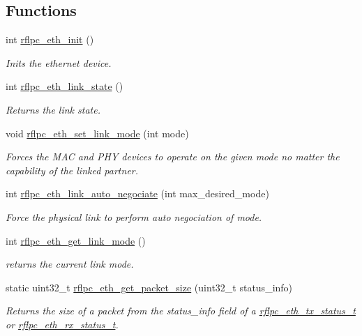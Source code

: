 \subsection*{Functions}
\begin{DoxyCompactItemize}
\item 
\hypertarget{group__eth_gade7d32e2e9ff5cb517b47513b0a293a8}{int \hyperlink{group__eth_gade7d32e2e9ff5cb517b47513b0a293a8}{rflpc\-\_\-eth\-\_\-init} ()}\label{group__eth_gade7d32e2e9ff5cb517b47513b0a293a8}

\begin{DoxyCompactList}\small\item\em Inits the ethernet device. \end{DoxyCompactList}\item 
int \hyperlink{group__eth_ga118494d89093096fb27fbd6feb746b84}{rflpc\-\_\-eth\-\_\-link\-\_\-state} ()
\begin{DoxyCompactList}\small\item\em Returns the link state. \end{DoxyCompactList}\item 
void \hyperlink{group__eth_gad8d8a82c4aed3c98c358814619b234d9}{rflpc\-\_\-eth\-\_\-set\-\_\-link\-\_\-mode} (int mode)
\begin{DoxyCompactList}\small\item\em Forces the M\-A\-C and P\-H\-Y devices to operate on the given mode no matter the capability of the linked partner. \end{DoxyCompactList}\item 
int \hyperlink{group__eth_ga53be61699736b3d80d972347bb78be45}{rflpc\-\_\-eth\-\_\-link\-\_\-auto\-\_\-negociate} (int max\-\_\-desired\-\_\-mode)
\begin{DoxyCompactList}\small\item\em Force the physical link to perform auto negociation of mode. \end{DoxyCompactList}\item 
int \hyperlink{group__eth_ga5b73a8c385152888baff90c83e34fdb0}{rflpc\-\_\-eth\-\_\-get\-\_\-link\-\_\-mode} ()
\begin{DoxyCompactList}\small\item\em returns the current link mode. \end{DoxyCompactList}\item 
static uint32\-\_\-t \hyperlink{group__eth_ga92aaec21aabcfc33e2eb1cd288a9de2f}{rflpc\-\_\-eth\-\_\-get\-\_\-packet\-\_\-size} (uint32\-\_\-t status\-\_\-info)
\begin{DoxyCompactList}\small\item\em Returns the size of a packet from the status\-\_\-info field of a \hyperlink{structrflpc__eth__tx__status__t}{rflpc\-\_\-eth\-\_\-tx\-\_\-status\-\_\-t} or \hyperlink{structrflpc__eth__rx__status__t}{rflpc\-\_\-eth\-\_\-rx\-\_\-status\-\_\-t}. \end{DoxyCompactList}\item 

\end{DoxyCompactItemize}

